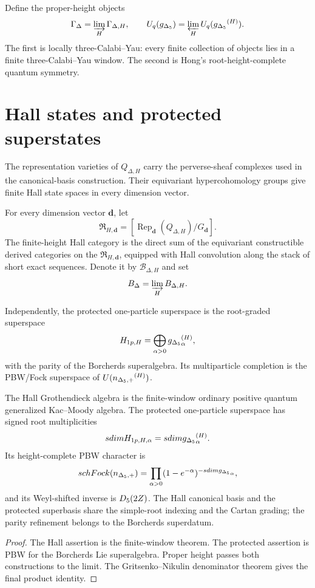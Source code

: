 Define the proper-height objects
\[
 \Gamma_\Delta=\varinjlim_H\Gamma_{\Delta,H},
 \qquad
 \widehat U_q(\gIg)=\varprojlim_H U_q(\gIg^{(H)}).
\]
The first is locally three-Calabi--Yau: every finite collection of objects lies in a finite three-Calabi--Yau window.  The second is Hong's root-height-complete quantum symmetry.

\chapter{Hall states and protected superstates}
The representation varieties of $Q_{\Delta,H}$ carry the perverse-sheaf complexes used in the canonical-basis construction.  Their equivariant hypercohomology groups give finite Hall state spaces in every dimension vector.

\begin{definition}
For every dimension vector $\mathbf d$, let
\[
 \mathfrak R_{H,\mathbf d}=
 [\operatorname{Rep}_{\mathbf d}(Q_{\Delta,H})/G_{\mathbf d}].
\]
The finite-height Hall category is the direct sum of the equivariant constructible derived categories on the $\mathfrak R_{H,\mathbf d}$, equipped with Hall convolution along the stack of short exact sequences.  Denote it by $\mathcal B_{\Delta,H}$ and set
\[
 \mathcal B_\Delta=\varinjlim_H\mathcal B_{\Delta,H}.
\]
\end{definition}

Independently, the protected one-particle superspace is the root-graded superspace
\[
 \mathcal H_{\mathrm{1p},H}
 =\bigoplus_{\alpha>0}\gIg^{(H)}_\alpha,
\]
with the parity of the Borcherds superalgebra.  Its multiparticle completion is the PBW/Fock superspace of $U(\nIg^{(H)})$.

\begin{theorem}
The Hall Grothendieck algebra is the finite-window ordinary positive quantum generalized Kac--Moody algebra.  The protected one-particle superspace has signed root multiplicities
\[
 \sdim\mathcal H_{\mathrm{1p},H,\alpha}
 =\sdim\gIg^{(H)}_\alpha.
\]
Its height-complete PBW character is
\[
 \sch\Fock(\nIg)
 =\prod_{\alpha>0}(1-e^{-\alpha})^{-\sdim\gIg_\alpha},
\]
and its Weyl-shifted inverse is $\Dmon(2Z)$.  The Hall canonical basis and the protected superbasis share the simple-root indexing and the Cartan grading; the parity refinement belongs to the Borcherds superdatum.
\end{theorem}
\begin{proof}
The Hall assertion is the finite-window theorem.  The protected assertion is PBW for the Borcherds Lie superalgebra.  Proper height passes both constructions to the limit.  The Gritsenko--Nikulin denominator theorem gives the final product identity.
\end{proof}

